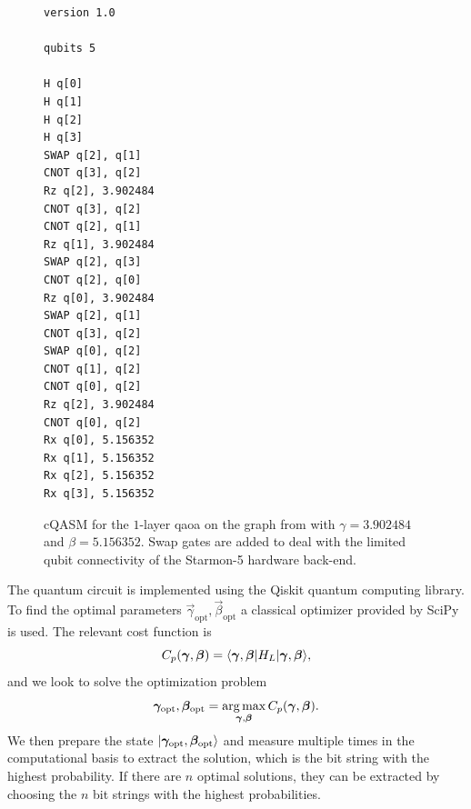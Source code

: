 \begin{figure}[H]
    \begin{verbatim}
version 1.0

qubits 5

H q[0]
H q[1]
H q[2]
H q[3]
SWAP q[2], q[1]
CNOT q[3], q[2]
Rz q[2], 3.902484
CNOT q[3], q[2]
CNOT q[2], q[1]
Rz q[1], 3.902484
SWAP q[2], q[3]
CNOT q[2], q[0]
Rz q[0], 3.902484
SWAP q[2], q[1]
CNOT q[3], q[2]
SWAP q[0], q[2]
CNOT q[1], q[2]
CNOT q[0], q[2]
Rz q[2], 3.902484
CNOT q[0], q[2]
Rx q[0], 5.156352
Rx q[1], 5.156352
Rx q[2], 5.156352
Rx q[3], 5.156352
    \end{verbatim}
    \caption[cQASM for the $p$-layer \gls{qaoa} on the graph from .]{
        cQASM for the $1$-layer \gls{qaoa} on the graph from  with $\gamma = 3.902484$ and $\beta = 5.156352$.
        Swap gates are added to deal with the limited qubit connectivity of the Starmon-5 hardware back-end.
    }
    \label{fig:qaoa-cqasm}
\end{figure}


The quantum circuit is implemented using the Qiskit quantum computing library.
To find the optimal parameters $\vec{\gamma}_\text{opt}, \vec{\beta}_\text{opt}$ a classical optimizer provided by SciPy is used.
The relevant cost function is
\begin{equation}
C_p(\bm{\gamma}, \bm{\beta}) = \langle{\bm{\gamma}, \bm{\beta}}\vert H_L\vert{\bm{\gamma}, \bm{\beta}}\rangle,
\end{equation}
and we look to solve the optimization problem
\begin{equation}
\bm{\gamma}_\text{opt}, \bm{\beta}_\text{opt} = \operatorname*{arg\,max}_{\bm{\gamma}, \bm{\beta}} C_p(\bm{\gamma}, \bm{\beta}).
\end{equation}
We then prepare the state $\vert{\bm{\gamma}_\text{opt}, \bm{\beta}_\text{opt}}\rangle$ and measure multiple times in the computational basis to extract the solution, which is the bit string with the highest probability.
If there are $n$ optimal solutions, they can be extracted by choosing the $n$ bit strings with the highest probabilities. 

